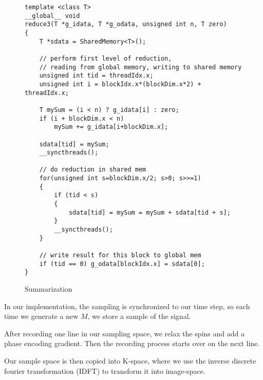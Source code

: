 \begin{figure*}[h]
\begin{lstlisting}
template <class T>
__global__ void
reduce3(T *g_idata, T *g_odata, unsigned int n, T zero)
{
    T *sdata = SharedMemory<T>();

    // perform first level of reduction,
    // reading from global memory, writing to shared memory
    unsigned int tid = threadIdx.x;
    unsigned int i = blockIdx.x*(blockDim.x*2) + threadIdx.x;

    T mySum = (i < n) ? g_idata[i] : zero;
    if (i + blockDim.x < n) 
        mySum += g_idata[i+blockDim.x];  

    sdata[tid] = mySum;
    __syncthreads();

    // do reduction in shared mem
    for(unsigned int s=blockDim.x/2; s>0; s>>=1) 
    {
        if (tid < s) 
        {
            sdata[tid] = mySum = mySum + sdata[tid + s];
        }
        __syncthreads();
    }

    // write result for this block to global mem 
    if (tid == 0) g_odata[blockIdx.x] = sdata[0];
}
\end{lstlisting}
  \caption{Summarization}
  \label{fig:reduce}
\end{figure*}

In our implementation, the sampling is synchronized to our time step,
so each time we generate a new $M$, we store a sample of the signal.

After recording one line in our sampling space, we relax the spins and
add a phase encoding gradient. Then the recording process starts over
on the next line.

Our sample space is then copied into K-space, where we use the inverse
discrete fourier transformation (IDFT) to transform it into
image-space.




